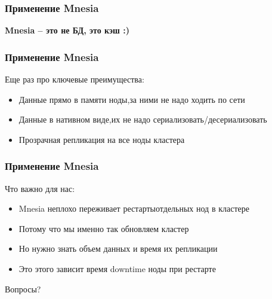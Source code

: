 \documentclass[10pt]{beamer}
\begin{document}
\begin{frame}
\frametitle{Применение Mnesia}
\centering
\textbf{Mnesia -- это не БД, это кэш :)}
\end{frame}

\begin{frame}
\frametitle{Применение Mnesia}
Еще раз про ключевые преимущества:
\begin{itemize}
\item Данные прямо в памяти ноды,\newline за ними не надо ходить по сети
\item Данные в нативном виде,\newline их не надо сериализовать/десериализовать
\item Прозрачная репликация на все ноды кластера
\end{itemize}
\end{frame}

\begin{frame}
\frametitle{Применение Mnesia}
Что важно для нас:
\begin{itemize}
\item Mnesia неплохо переживает рестарты\newline отдельных нод в кластере
\item Потому что мы именно так обновляем кластер
\item Но нужно знать объем данных и время их репликации
\item Это этого зависит время downtime ноды при рестарте
\end{itemize}
\end{frame}

\begin{frame}
\centering
Вопросы?
\end{frame}
\end{document}

